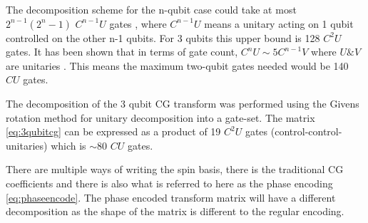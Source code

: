 \documentclass[12pt]{article}
\newcommand{\rtwo}{\sqrt{2}}
\begin{document}
The decomposition scheme for the n-qubit case could take at most $2^{n-1}(2^n-1)$ $C^{n-1}U$ gates \cite{li2013decomposition}, where $C^{n-1}U$ means a unitary acting on 1 qubit controlled on the other n-1 qubits. For 3 qubits this upper bound is 128 $C^2U$ gates. It has been shown that in terms of gate count, $C^nU \sim 5 C^{n-1}V$ where $U \& V$ are unitaries \cite{barenco1995elementary}. This means the maximum two-qubit gates needed would be 140 $CU$ gates.

The decomposition of the 3 qubit CG transform was performed using the Givens rotation method for unitary decomposition into a gate-set. The matrix \autoref{eq:3qubitcg} can be expressed as a product of 19 $C^2U$ gates (control-control-unitaries) which is $\sim$80 $CU$ gates. 

There are multiple ways of writing the spin basis, there is the traditional CG coefficients and there is also what is referred to here as the phase encoding \autoref{eq:phaseencode}. The phase encoded transform matrix will have a different decomposition as the shape of the matrix is different to the regular encoding. 

\end{document}
